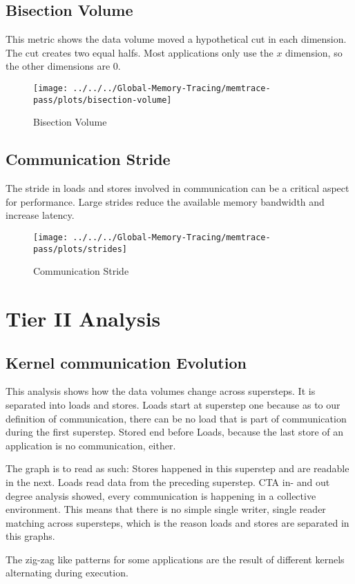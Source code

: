 \subsection{Bisection Volume}
This metric shows the data volume moved a hypothetical cut in each dimension. The cut creates two equal halfs. Most applications only use the $x$ dimension, so the other dimensions are 0.
\begin{figure}[t]
	\centering
	\texttt{[image: ../../../Global-Memory-Tracing/memtrace-pass/plots/bisection-volume]}
	\caption{Bisection Volume}
	\label{bisection-vols}
\end{figure}
\subsection{Communication Stride}
The stride in loads and stores involved in communication can be a critical aspect for performance. Large strides reduce the available memory bandwidth and increase latency.
\begin{figure}[t]
	\centering
	\texttt{[image: ../../../Global-Memory-Tracing/memtrace-pass/plots/strides]}
	\caption{Communication Stride}
	\label{com-stride}
\end{figure}
\newpage
\section{Tier II Analysis}
\subsection{Kernel communication Evolution}
This analysis shows how the data volumes change across supersteps. It is separated into loads and stores. Loads start at superstep one because as to our definition of communication, there can be no load that is part
of communication during the first superstep. Stored end before Loads, because the last store of an application is no communication, either.

The graph is to read as such: Stores happened in this superstep and are readable in the next. Loads read data from the preceding superstep. CTA in- and out degree analysis showed, every communication is happening in a collective environment. This means that there is no simple single writer, single reader matching across supersteps, which is the reason loads and stores are separated in this graphs.

The zig-zag like patterns for some applications are the result of different kernels alternating during
execution.

